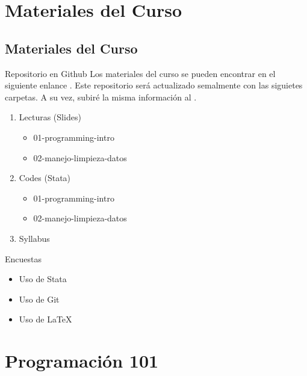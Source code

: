 \documentclass[11pt, aspectratio=169, compress]{beamer}
\begin{document}
\section{Materiales del Curso}
\subsection{Materiales del Curso}
\begin{frame}{Repositorio en Github}
	Los materiales del curso se pueden encontrar en el siguiente enlance \href{https://github.com/lambda-stata/course-materials}{\color{blue}{enlace}}. Este repositorio será actualizado semalmente con las siguietes carpetas. A su vez, subiré la misma información al \href{https://canvas.instructure.com/courses/2136052}{\color{blue}{Canvas}}. 
	\begin{enumerate}
		\item Lecturas (Slides)
		\begin{itemize}
			\item 01-programming-intro
			\item 02-manejo-limpieza-datos
		\end{itemize}
		\item Codes (Stata)
		\begin{itemize}
			\item 01-programming-intro
			\item 02-manejo-limpieza-datos
		\end{itemize} 
		\item Syllabus
	\end{enumerate}
\end{frame}
\begin{frame}{Encuestas}
	\begin{itemize}
		\item Uso de Stata
		\item Uso de Git
		\item Uso de \LaTeX
	\end{itemize}
\end{frame}
\section{Programación 101}
\end{document}
